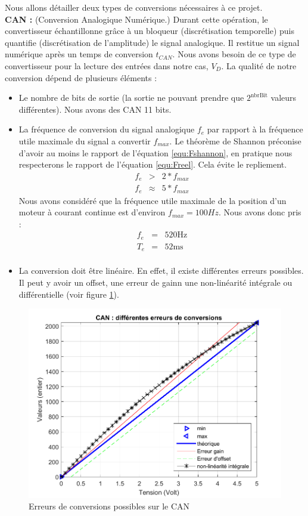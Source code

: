 Nous allons détailler deux types de conversions nécessaires à ce projet. \\
\hspace{3mm} \textbf{CAN :} (Conversion Analogique Numérique.) Durant cette opération, le convertisseur échantillonne grâce à un bloqueur (discrétisation temporelle) puis quantifie (discrétisation de l'amplitude) le signal analogique. Il restitue un signal numérique après un temps de conversion $t_{CAN}$. Nous avons besoin de ce type de convertisseur pour la lecture des entrées dans notre cas, $V_{D}$. La qualité de notre conversion dépend de plusieurs éléments : 
\begin{itemize}
\item Le nombre de bits de sortie (la sortie ne pouvant prendre que $2^{\text{nbrBit}}$ valeurs différentes). Nous avons des CAN 11 bits.
\item La fréquence de conversion du signal analogique $f_{e}$ par rapport à la fréquence utile maximale du signal a convertir $f_{max}$. Le théorème de Shannon préconise d'avoir au moins le rapport de l'équation \ref{equ:Fshannon}, en pratique nous respecterons le rapport de l'équation \ref{equ:Freel}. Cela évite le repliement.
\begin{eqnarray}
\label{equ:Fshannon} f_e &>& 2*f_{max}\\
\label{equ:Freel} f_e & \approx & 5*f_{max}
\end{eqnarray}
Nous avons considéré que la fréquence utile maximale de la position d'un moteur à courant continue est d'environ $f_{max} = 100Hz$. Nous avons donc pris :
\begin{eqnarray}
\label{equ:fe}f_e &=& 520\text{Hz}\\
\label{equ:Te} T_e &=& 52 \text{ms}\\
\end{eqnarray}
\item La conversion doit être linéaire. En effet, il existe différentes erreurs possibles. Il peut y avoir un offset, une erreur de gainn une non-linéarité intégrale ou différentielle (voir figure \ref{fig:errCAN}).
\end{itemize}
\begin{figure}[!ht]
\centering 
\includegraphics[width=.6\textwidth]{./V/images/CAN.pdf}
\caption{\label{fig:errCAN}Erreurs de conversions possibles sur le CAN}
\end{figure}

